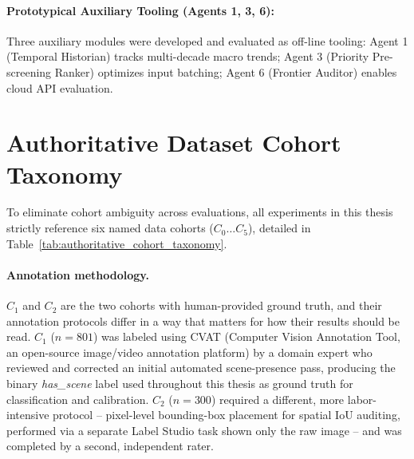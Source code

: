 \documentclass[12pt,a4paper]{report}
\begin{document}
\paragraph{Prototypical Auxiliary Tooling (Agents 1, 3, 6):} Three auxiliary modules were developed and evaluated as off-line tooling: Agent 1 (Temporal Historian) tracks multi-decade macro trends; Agent 3 (Priority Pre-screening Ranker) optimizes input batching; Agent 6 (Frontier Auditor) enables cloud API evaluation.

\section{Authoritative Dataset Cohort Taxonomy}
\label{sec:cohort_taxonomy}
To eliminate cohort ambiguity across evaluations, all experiments in this thesis strictly reference six named data cohorts ($C_0 \dots C_5$), detailed in Table~\ref{tab:authoritative_cohort_taxonomy}.

\paragraph{Annotation methodology.} $C_1$ and $C_2$ are the two cohorts with human-provided ground truth, and their annotation protocols differ in a way that matters for how their results should be read. $C_1$ ($n=801$) was labeled using CVAT (Computer Vision Annotation Tool, an open-source image/video annotation platform) by a domain expert who reviewed and corrected an initial automated scene-presence pass, producing the binary \textit{has\_scene} label used throughout this thesis as ground truth for classification and calibration. $C_2$ ($n=300$) required a different, more labor-intensive protocol -- pixel-level bounding-box placement for spatial IoU auditing, performed via a separate Label Studio task shown only the raw image -- and was completed by a second, independent rater.
\end{document}
